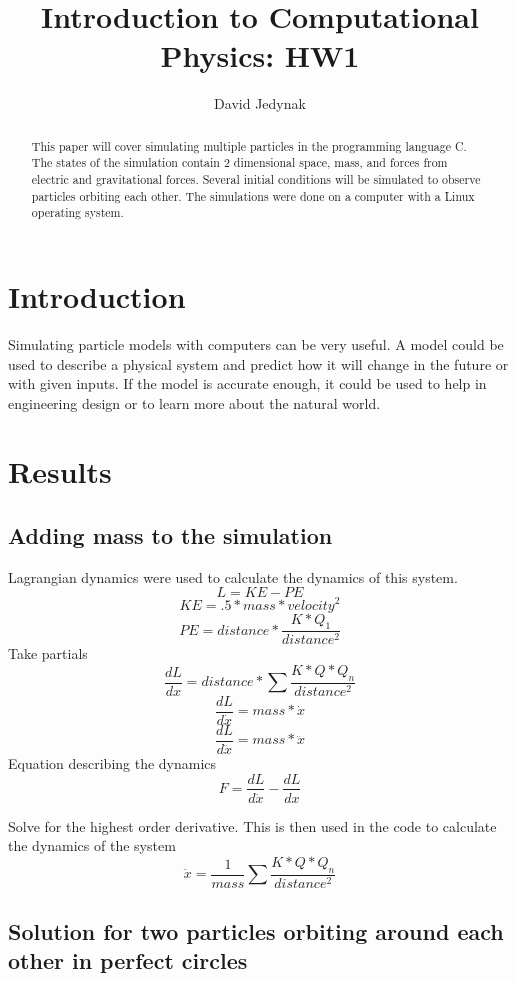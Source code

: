 \documentclass[a4paper]{article}
\title{Introduction to Computational Physics: HW1}
\author{David Jedynak}
\begin{document}
\maketitle

\begin{abstract}
This paper will cover simulating multiple particles in the programming language C. The states of the simulation contain 2 dimensional space, mass, and forces from electric and gravitational forces. Several initial conditions will be simulated to observe particles orbiting each other. The simulations were done on a computer with a Linux operating system.
\end{abstract}

\section{Introduction}

Simulating particle models with computers can be very useful. A model could be used to describe a physical system and predict how it will change in the future or with given inputs. If the model is accurate enough, it could be used to help in engineering design or to learn more about the natural world.

\section{Results}

\subsection{Adding mass to the simulation}

Lagrangian dynamics were used to calculate the dynamics of this system. 
\[L = KE - PE\]
\[KE = .5*mass*velocity^2\]
\[PE = distance*\frac{K*Q_1}{distance^2}\]
Take partials
\[\frac{dL}{dx} = distance*\sum\frac{K*Q*Q_n}{distance^2}\]
\[\frac{dL}{d\dot{x}} = mass *\dot{x}\]
\[\frac{dL}{d\ddot{x}} = mass *\ddot{x}\]
Equation describing the dynamics
\[F = \frac{dL}{d\ddot{x}}-\frac{dL}{dx} \]

Solve for the highest order derivative. This is then used in the code to calculate the dynamics of the system
\[\ddot{x} = \frac{1}{mass}\sum\frac{K*Q*Q_n}{distance^2}\]




\subsection{Solution for two particles orbiting around each other in perfect circles}
\end{document}
